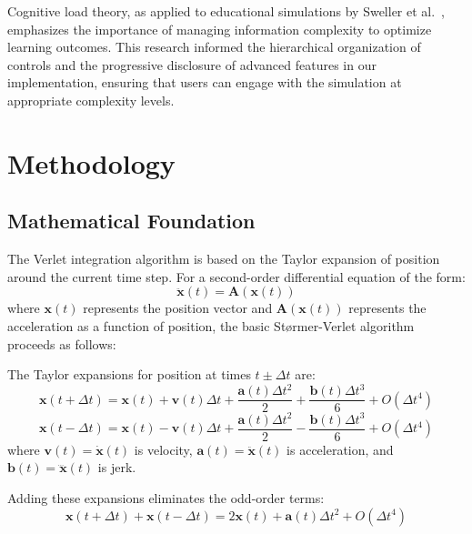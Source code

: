 \documentclass[12pt,journal,onecolumn]{IEEEtran}
\begin{document}
Cognitive load theory, as applied to educational simulations by Sweller et al.~\cite{sweller2011}, emphasizes the importance of managing information complexity to optimize learning outcomes. This research informed the hierarchical organization of controls and the progressive disclosure of advanced features in our implementation, ensuring that users can engage with the simulation at appropriate complexity levels.

\section{Methodology}

\subsection{Mathematical Foundation}
The Verlet integration algorithm is based on the Taylor expansion of position around the current time step. For a second-order differential equation of the form:
\begin{equation}
\ddot{\mathbf{x}}(t) = \mathbf{A}(\mathbf{x}(t))
\end{equation}
where $\mathbf{x}(t)$ represents the position vector and $\mathbf{A}(\mathbf{x}(t))$ represents the acceleration as a function of position, the basic Størmer-Verlet algorithm proceeds as follows:

The Taylor expansions for position at times $t \pm \Delta t$ are:
\begin{equation}
\mathbf{x}(t + \Delta t) = \mathbf{x}(t) + \mathbf{v}(t)\Delta t + \frac{\mathbf{a}(t)\Delta t^2}{2} + \frac{\mathbf{b}(t)\Delta t^3}{6} + O(\Delta t^4)
\end{equation}
\begin{equation}
\mathbf{x}(t - \Delta t) = \mathbf{x}(t) - \mathbf{v}(t)\Delta t + \frac{\mathbf{a}(t)\Delta t^2}{2} - \frac{\mathbf{b}(t)\Delta t^3}{6} + O(\Delta t^4)
\end{equation}
where $\mathbf{v}(t) = \dot{\mathbf{x}}(t)$ is velocity, $\mathbf{a}(t) = \ddot{\mathbf{x}}(t)$ is acceleration, and $\mathbf{b}(t) = \dddot{\mathbf{x}}(t)$ is jerk.

Adding these expansions eliminates the odd-order terms:
\begin{equation}
\mathbf{x}(t + \Delta t) + \mathbf{x}(t - \Delta t) = 2\mathbf{x}(t) + \mathbf{a}(t)\Delta t^2 + O(\Delta t^4)
\end{equation}
\end{document}
